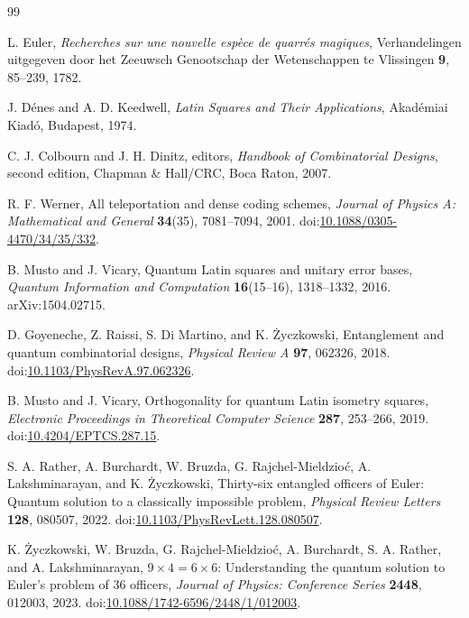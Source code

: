\documentclass[11pt,a4paper]{article}
\begin{document}
\begin{thebibliography}{99}
\small

L. Euler,
\newblock \emph{Recherches sur une nouvelle esp\`ece de quarr\'es magiques},
\newblock Verhandelingen uitgegeven door het Zeeuwsch Genootschap der
Wetenschappen te Vlissingen \textbf{9}, 85--239, 1782.

J. D\'enes and A. D. Keedwell,
\newblock \emph{Latin Squares and Their Applications},
\newblock Akad\'emiai Kiad\'o, Budapest, 1974.

C. J. Colbourn and J. H. Dinitz, editors,
\newblock \emph{Handbook of Combinatorial Designs}, second edition,
\newblock Chapman \& Hall/CRC, Boca Raton, 2007.

R. F. Werner,
\newblock All teleportation and dense coding schemes,
\newblock \emph{Journal of Physics A: Mathematical and General}
\textbf{34}(35), 7081--7094, 2001.
\newblock doi:\href{https://doi.org/10.1088/0305-4470/34/35/332}{10.1088/0305-4470/34/35/332}.

B. Musto and J. Vicary,
\newblock Quantum Latin squares and unitary error bases,
\newblock \emph{Quantum Information and Computation}
\textbf{16}(15--16), 1318--1332, 2016.
\newblock arXiv:1504.02715.

D. Goyeneche, Z. Raissi, S. Di Martino, and K. {\.{Z}}yczkowski,
\newblock Entanglement and quantum combinatorial designs,
\newblock \emph{Physical Review A} \textbf{97}, 062326, 2018.
\newblock doi:\href{https://doi.org/10.1103/PhysRevA.97.062326}{10.1103/PhysRevA.97.062326}.

B. Musto and J. Vicary,
\newblock Orthogonality for quantum Latin isometry squares,
\newblock \emph{Electronic Proceedings in Theoretical Computer Science}
\textbf{287}, 253--266, 2019.
\newblock doi:\href{https://doi.org/10.4204/EPTCS.287.15}{10.4204/EPTCS.287.15}.

S. A. Rather, A. Burchardt, W. Bruzda, G. Rajchel-Mieldzio\'c,
A. Lakshminarayan, and K. {\.{Z}}yczkowski,
\newblock Thirty-six entangled officers of Euler: Quantum solution to a
classically impossible problem,
\newblock \emph{Physical Review Letters} \textbf{128}, 080507, 2022.
\newblock doi:\href{https://doi.org/10.1103/PhysRevLett.128.080507}{10.1103/PhysRevLett.128.080507}.

K. {\.{Z}}yczkowski, W. Bruzda, G. Rajchel-Mieldzio\'c, A. Burchardt,
S. A. Rather, and A. Lakshminarayan,
\newblock $9\times4=6\times6$: Understanding the quantum solution to Euler's
problem of 36 officers,
\newblock \emph{Journal of Physics: Conference Series} \textbf{2448},
012003, 2023.
\newblock doi:\href{https://doi.org/10.1088/1742-6596/2448/1/012003}{10.1088/1742-6596/2448/1/012003}.


\end{thebibliography}
\end{document}
